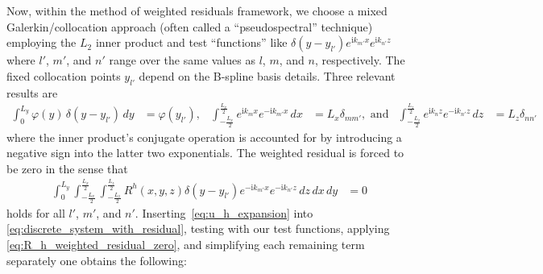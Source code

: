 \documentclass[letterpaper,11pt,nointlimits,reqno,draft]{amsbook}
\newcommand{\ii}{\ensuremath{\mathrm{i}}}
\begin{document}
Now, within the method of weighted residuals framework, we choose a mixed
Galerkin/collocation approach (often called a ``pseudospectral'' technique)
employing the $L_{2}$ inner product and test ``functions'' like
$\delta(y-y_{l'}) e^{\ii k_{m'} x}e^{\ii k_{n'} z}$ where $l'$, $m'$, and $n'$
range over the same values as $l$, $m$, and $n$, respectively.  The fixed
collocation points $y_{l'}$ depend on the B-spline basis details.  Three
relevant results are
\begin{align}
   \int_0^{L_y} \varphi(y) \, \delta(y-y_{l'}) \,d\!y
&= \varphi(y_{l'}),
&
   \int_{-\frac{L_x}{2}}^{\frac{L_x}{2}} e^{\ii k_m x} e^{-\ii k_{m'} x} \,d\!x
&= L_x \delta_{m m'}, \text{ and}
&
   \int_{-\frac{L_z}{2}}^{\frac{L_z}{2}} e^{\ii k_n z} e^{-\ii k_{n'} z} \,d\!z
&= L_z \delta_{n n'}
\end{align}
where the inner product's conjugate operation is accounted for by introducing a
negative sign into the latter two exponentials.  The weighted residual is
forced to be zero in the sense that
\begin{align}
  \int_0^{L_y}
  \int_{-\frac{L_x}{2}}^{\frac{L_x}{2}}
  \int_{-\frac{L_z}{2}}^{\frac{L_z}{2}}
  R^h\!\left(x,y,z\right) \delta(y-y_{l'}) e^{-\ii k_{m'} x}e^{-\ii k_{n'} z}
  \,d\!z \,d\!x \,d\!y
  &=
  0
  \label{eq:R_h_weighted_residual_zero}
\end{align}
holds for all $l'$, $m'$, and $n'$.  Inserting~\eqref{eq:u_h_expansion} into
\eqref{eq:discrete_system_with_residual}, testing with our test functions,
applying \eqref{eq:R_h_weighted_residual_zero}, and simplifying each remaining
term separately one obtains the following:
\end{document}
